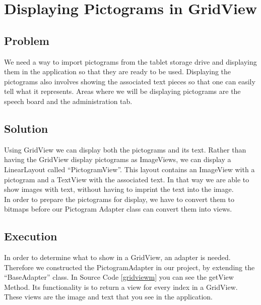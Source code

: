 \section{Displaying Pictograms in GridView} %
\label{disppict}

\subsection*{Problem}
We need a way to import pictograms from the tablet storage drive and displaying them in the application so that they are ready to be used.
Displaying the pictograms also involves showing the associated text pieces so that one can easily tell what it represents.
Areas where we will be displaying pictograms are the speech board and the administration tab.

\subsection*{Solution}
Using GridView we can display both the pictograms and its text.
Rather than having the GridView display pictograms as ImageViews, we can display a LinearLayout called ``PictogramView''.
This layout contains an ImageView with a pictogram and a TextView with the associated text.
In that way we are able to show images with text, without having to imprint the text into the image.\\

In order to prepare the pictograms for display, we have to convert them to bitmaps before our Pictogram Adapter class can convert them into views.

\subsection*{Execution}
In order to determine what to show in a GridView, an adapter is needed. Therefore we constructed the PictogramAdapter in our project, by extending the ``BaseAdapter'' class.
In Source Code \ref{gridviewm} you can see the getView Method. Its functionality is to return a view for every index in a GridView.
These views are the image and text that you see in the application.\\


